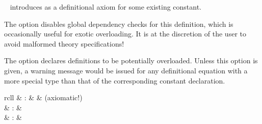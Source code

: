 \begin{isabellebody}
\begin{isamarkuptext}
\begin{description}
  \item \hyperlink{command.defs}{\mbox{}}~ introduces 
  as a definitional axiom for some existing constant.
  
  The  option disables global dependency checks
  for this definition, which is occasionally useful for exotic
  overloading.  It is at the discretion of the user to avoid malformed
  theory specifications!
  
  The  option declares definitions to be
  potentially overloaded.  Unless this option is given, a warning
  message would be issued for any definitional equation with a more
  special type than that of the corresponding constant declaration.
  
  \end{description}%
\end{isamarkuptext}%
\isamarkuptrue%
%
\isamarkuptrue%
%
\begin{isamarkuptext}%
\begin{matharray}{rcll}
    \hypertarget{command.axioms}{\hyperlink{command.axioms}{\mbox{}}} & : &  & (axiomatic!) \\
    \hypertarget{command.lemmas}{\hyperlink{command.lemmas}{\mbox{}}} & : &  \\
    \hypertarget{command.theorems}{\hyperlink{command.theorems}{\mbox{}}} & : &  \\
  \end{matharray}


\end{isamarkuptext}
\end{isabellebody}

